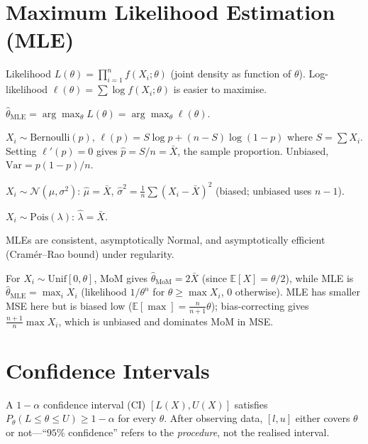 \section{Maximum Likelihood Estimation (MLE)}
\label{sec:mle}
Likelihood $L(\theta)=\prod_{i=1}^n f(X_i;\theta)$ (joint density as function of $\theta$). Log-likelihood $\ell(\theta)=\sum\log f(X_i;\theta)$ is easier to maximise.

\begin{definition}[MLE] $\hat\theta_{\mathrm{MLE}}=\arg\max_\theta L(\theta)=\arg\max_\theta\ell(\theta)$.
\end{definition}

\begin{example} $X_i\sim\mathrm{Bernoulli}(p)$, $\ell(p)=S\log p+(n-S)\log(1-p)$ where $S=\sum X_i$. Setting $\ell'(p)=0$ gives $\hat p=S/n=\bar X$, the sample proportion. Unbiased, $\mathrm{Var}=p(1-p)/n$.
\end{example}

\begin{example} $X_i\sim\mathcal{N}(\mu,\sigma^2)$: $\hat\mu=\bar X$, $\hat\sigma^2=\frac1n\sum(X_i-\bar X)^2$ (biased; unbiased uses $n-1$).
\end{example}

\begin{example} $X_i\sim\mathrm{Pois}(\lambda)$: $\hat\lambda=\bar X$.
\end{example}

MLEs are consistent, asymptotically Normal, and asymptotically efficient (Cram\'er--Rao bound) under regularity.

\begin{example} For $X_i\sim\mathrm{Unif}[0,\theta]$, MoM gives $\hat\theta_{\mathrm{MoM}}=2\bar X$ (since $\mathbb{E}[X]=\theta/2$), while MLE is $\hat\theta_{\mathrm{MLE}}=\max_i X_i$ (likelihood $1/\theta^n$ for $\theta\ge\max X_i$, $0$ otherwise). MLE has smaller MSE here but is biased low ($\mathbb{E}[\max]=\frac{n}{n+1}\theta$); bias-correcting gives $\frac{n+1}{n}\max X_i$, which is unbiased and dominates MoM in MSE.
\end{example}

\section{Confidence Intervals}
\label{sec:ci}

\begin{definition} A $1-\alpha$ confidence interval (CI) $[L(X),U(X)]$ satisfies $P_\theta(L\le\theta\le U)\ge1-\alpha$ for every $\theta$. After observing data, $[l,u]$ either covers $\theta$ or not---``$95\%$ confidence'' refers to the \emph{procedure}, not the realised interval.
\end{definition}


